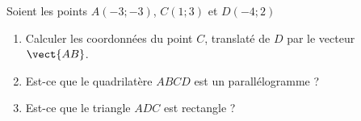 
\begin{exercice}\label{exosmath-0682}

    Soient les points \( A(-3;-3)\), \( C(1;3)\) et \( D(-4;2)\)
    \begin{enumerate}
        \item
            Calculer les coordonnées du point \( C\), translaté de \( D\) par le vecteur \( \vect{ AB }\).
        \item
            Est-ce que le quadrilatère \( ABCD\) est un parallélogramme ?
        \item
            Est-ce que le triangle \( ADC\) est rectangle ?
    \end{enumerate}

\end{exercice}
